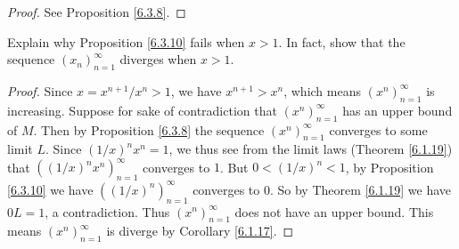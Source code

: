 \begin{proof}
See Proposition \ref{6.3.8}.
\end{proof}

\begin{exercise}\label{ex 6.3.4}
Explain why Proposition \ref{6.3.10} fails when \(x > 1\).
In fact, show that the sequence \((x_n)_{n = 1}^\infty\) diverges when \(x > 1\).
\end{exercise}

\begin{proof}
Since \(x = x^{n + 1} / x^n > 1\), we have \(x^{n + 1} > x^n\), which means \((x^n)_{n = 1}^\infty\) is increasing.
Suppose for sake of contradiction that \((x^n)_{n = 1}^\infty\) has an upper bound of \(M\).
Then by Proposition \ref{6.3.8} the sequence \((x^n)_{n = 1}^\infty\) converges to some limit \(L\).
Since \((1 / x)^n x^n = 1\), we thus see from the limit laws (Theorem \ref{6.1.19}) that \(((1 / x)^n x^n)_{n = 1}^\infty\) converges to \(1\).
But \(0 < (1 / x)^n < 1\), by Proposition \ref{6.3.10} we have \(((1 / x)^n)_{n = 1}^\infty\) converges to \(0\).
So by Theorem \ref{6.1.19} we have \(0L = 1\), a contradiction.
Thus \((x^n)_{n = 1}^\infty\) does not have an upper bound.
This means \((x^n)_{n = 1}^\infty\) is diverge by Corollary \ref{6.1.17}.
\end{proof}